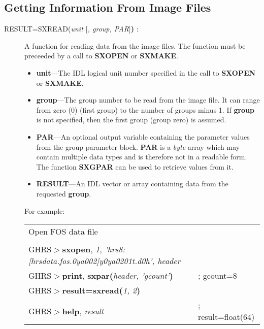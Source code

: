 \subsection{\bf Getting Information From Image Files}
\begin{description}
\item [RESULT=SXREAD({\it unit $[$, group, PAR$]$}{\bf )} :] 

A function for reading data from the image files. The function must be
preceeded by a call to {\bf SXOPEN} or {\bf SXMAKE}.

\begin{itemize}

\item {\bf unit}---The IDL logical unit number specified in the call to 
{\bf SXOPEN} or {\bf SXMAKE}. 

\item {\bf group}---The group number to be read from the image file.  It can
range from zero (0) (first group) to the number of groups minus 1. 
If {\bf group} is not specified, then the first group (group zero) is assumed.

\item {\bf PAR}---An optional output variable containing the parameter values 
from the group parameter block.  {\bf PAR} is a {\it byte} array which may 
contain multiple data types and is therefore not in a readable form.  The 
function {\bf SXGPAR} can be used to retrieve values from it.

\item {\bf RESULT}---An IDL vector or array containing data from the 
requested {\bf group}.

\end{itemize}

\noindent
For example:\\

\begin{small}
\begin{tabular}{ll}
Open FOS data file & \\
& \\
GHRS$>${\bf sxopen}, {\it 1, 'hrs8:[hrsdata.fos.0ya002]y0ya0201t.d0h', header} & \\
GHRS$>${\bf print}, {\bf sxpar(}{\it header, 'gcount'}{\bf )} & ; gcount=8\\
GHRS$>${\bf result=sxread(}{\it 1, 2}{\bf )} & \\
GHRS$>${\bf help}, {\it result} & ; result=float(64)\\
\end{tabular}
\end{small}\\


\end{description}
